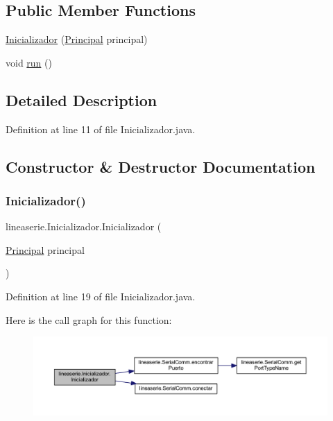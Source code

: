 \subsection*{Public Member Functions}
\begin{DoxyCompactItemize}
\item 
\mbox{\hyperlink{classlineaserie_1_1_inicializador_a86958a2a419199116654e4f259e86a66}{Inicializador}} (\mbox{\hyperlink{classvistas_1_1_principal}{Principal}} principal)
\item 
void \mbox{\hyperlink{classlineaserie_1_1_inicializador_a8163b9059ff9417835aae96eddd8464a}{run}} ()
\end{DoxyCompactItemize}


\subsection{Detailed Description}


Definition at line 11 of file Inicializador.\+java.



\subsection{Constructor \& Destructor Documentation}
\mbox{\label{classlineaserie_1_1_inicializador_a86958a2a419199116654e4f259e86a66}} 
\subsubsection{\texorpdfstring{Inicializador()}{Inicializador()}}
{\footnotesize\ttfamily lineaserie.\+Inicializador.\+Inicializador (\begin{DoxyParamCaption}\item[{\mbox{\hyperlink{classvistas_1_1_principal}{Principal}}}]{principal }\end{DoxyParamCaption})}



Definition at line 19 of file Inicializador.\+java.

Here is the call graph for this function\+:
\nopagebreak
\begin{figure}[H]
\begin{center}
\leavevmode
\includegraphics[width=350pt]{classlineaserie_1_1_inicializador_a86958a2a419199116654e4f259e86a66_cgraph}
\end{center}
\end{figure}


